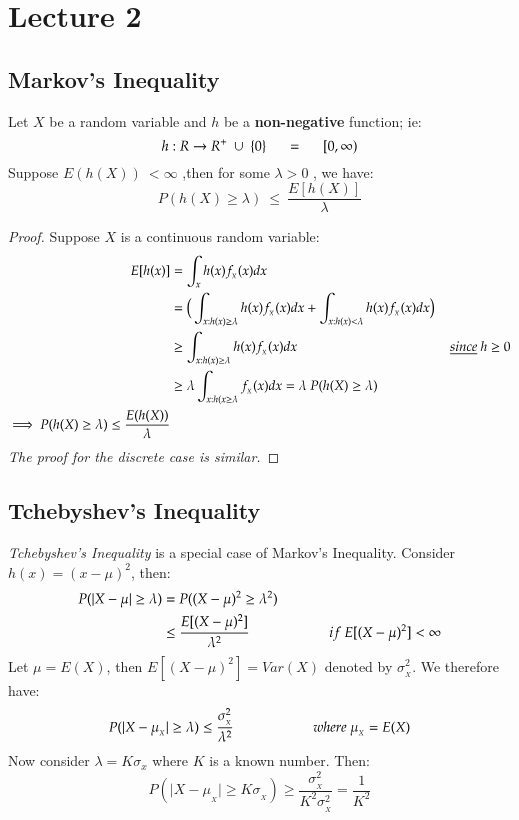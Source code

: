 \documentclass[14pt,twoside,a4paper,fleqn]{article}
\theoremstyle{plain}
\begin{document}
\newpage
\section{Lecture 2}
\subsection{Markov's Inequality}
Let $X$ be a random variable and $h$ be a \textbf{non-negative} function; ie:
	\begin{equation*}
	h:R->R^{+}\ \cup\ \{0\}\tab[0.5cm]=\tab[0.5cm] [0,\infty)
	\end{equation*}
Suppose $E(h(X))\ < \infty$ ,then for some $\lambda > 0$ , we have:
	\begin{equation}\label{markov}
	P(h(X) \geq \lambda)\ \leq\ \frac{E[h(X)]}{\lambda}
	\end{equation}
\begin{proof}
Suppose $X$ is a continuous random variable:
	\begin{equation*}
	\begin{split}
	E[h(x)] &= \int_{x} h(x)f_{_X}(x)dx \\
		&=\Big(\int_{x:h(x)\geq\lambda}h(x)f_{_X}(x)dx + \int_{x:h(x) < \lambda}h(x)f_{_X}(x)dx\Big) \\
		&\geq \int_{x:h(x)\geq\lambda}h(x)f_{_X}(x)dx\tab[4cm] \underline{since}\ h\geq 0\\
		&\geq\lambda \int_{x:h(x\geq\lambda}f_{_X}(x)dx = \lambda\ P(h(X)\geq \lambda)\\
		\implies P(h(X)\geq \lambda) \leq \frac{E(h(X))}{\lambda}
	\end{split}
	\end{equation*}
\emph{The proof for the discrete case is similar.}
\end{proof} 

\subsection{Tchebyshev's Inequality}
\emph{Tchebyshev's Inequality} is a special case of Markov's Inequality. \mbox{Consider $h(x) = (x-\mu)^2$}, then:
	\begin{equation*}
	\begin{split}
	P(\vert X-\mu \vert \geq \lambda) &= P((X-\mu)^2 \geq \lambda^2)\\
		&\leq \frac{E[(X-\mu)^2]}{\lambda^2}\tab[2cm]if\ E[(X-\mu)^2]<\infty
	\end{split}
	\end{equation*}
Let $\mu = E(X)$, then $E[(X-\mu)^2] = Var(X)$ denoted by $\sigma_{_X}^2$. We therefore have:
	\begin{equation}\label{tchev_sigma}
		P(\vert X-\mu_{_X} \vert \geq \lambda) \leq \frac{\sigma_{_X}^2}{\lambda^2}\tab[2cm] where\ \mu_{_X} = E(X)
	\end{equation}
Now consider $\lambda= K\sigma_x$ where $K$ is a known number. Then:
	\begin{equation}\label{tchev}
		P(\vert X-\mu_{_X}\vert \geq K\sigma_{_X}) \geq \frac{\sigma_{_X}^2}{K^2\sigma_{_X}^2}=\frac{1}{K^2}
	\end{equation}
\end{document}
